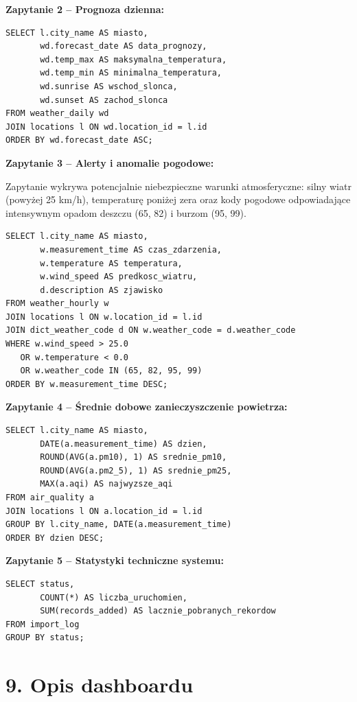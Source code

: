 \documentclass[12pt, a4paper]{article}
\begin{document}
\textbf{Zapytanie 2 -- Prognoza dzienna:}
\begin{lstlisting}
SELECT l.city_name AS miasto,
       wd.forecast_date AS data_prognozy,
       wd.temp_max AS maksymalna_temperatura,
       wd.temp_min AS minimalna_temperatura,
       wd.sunrise AS wschod_slonca,
       wd.sunset AS zachod_slonca
FROM weather_daily wd
JOIN locations l ON wd.location_id = l.id
ORDER BY wd.forecast_date ASC;
\end{lstlisting}

\textbf{Zapytanie 3 -- Alerty i anomalie pogodowe:}

Zapytanie wykrywa potencjalnie niebezpieczne warunki atmosferyczne: silny wiatr
(powyżej 25 km/h), temperaturę poniżej zera oraz kody pogodowe odpowiadające
intensywnym opadom deszczu (65, 82) i burzom (95, 99).

\begin{lstlisting}
SELECT l.city_name AS miasto,
       w.measurement_time AS czas_zdarzenia,
       w.temperature AS temperatura,
       w.wind_speed AS predkosc_wiatru,
       d.description AS zjawisko
FROM weather_hourly w
JOIN locations l ON w.location_id = l.id
JOIN dict_weather_code d ON w.weather_code = d.weather_code
WHERE w.wind_speed > 25.0
   OR w.temperature < 0.0
   OR w.weather_code IN (65, 82, 95, 99)
ORDER BY w.measurement_time DESC;
\end{lstlisting}

\textbf{Zapytanie 4 -- Średnie dobowe zanieczyszczenie powietrza:}
\begin{lstlisting}
SELECT l.city_name AS miasto,
       DATE(a.measurement_time) AS dzien,
       ROUND(AVG(a.pm10), 1) AS srednie_pm10,
       ROUND(AVG(a.pm2_5), 1) AS srednie_pm25,
       MAX(a.aqi) AS najwyzsze_aqi
FROM air_quality a
JOIN locations l ON a.location_id = l.id
GROUP BY l.city_name, DATE(a.measurement_time)
ORDER BY dzien DESC;
\end{lstlisting}

\textbf{Zapytanie 5 -- Statystyki techniczne systemu:}
\begin{lstlisting}
SELECT status,
       COUNT(*) AS liczba_uruchomien,
       SUM(records_added) AS lacznie_pobranych_rekordow
FROM import_log
GROUP BY status;
\end{lstlisting}


\section*{\textbf{9. Opis dashboardu}}
\end{document}
